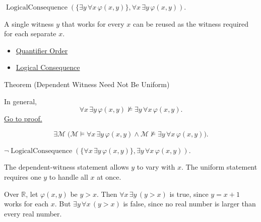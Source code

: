\begin{remark*}
\(\operatorname{LogicalConsequence}(\{\exists y\,\forall x\,\varphi(x,y)\},
\forall x\,\exists y\,\varphi(x,y))\).
\end{remark*}

\begin{remark*}[Interpretation]
A single witness \(y\) that works for every \(x\) can be reused as the
witness required for each separate \(x\).
\end{remark*}

\begin{dependencies}
\begin{itemize}
  \item \hyperref[def:q-alt]{Quantifier Order}
  \item \hyperref[def:log-consequence]{Logical Consequence}
\end{itemize}
\end{dependencies}

\begin{theorembox}{Theorem (Dependent Witness Need Not Be Uniform)}
\begin{theorem}
\label{thm:dependent-witness-not-uniform}
In general,
\[
\forall x\,\exists y\,\varphi(x,y)
\not\models
\exists y\,\forall x\,\varphi(x,y).
\]
\hyperref[prf:dependent-witness-not-uniform]{Go to proof.}
\end{theorem}
\end{theorembox}

\begin{remark*}
\[
\exists \mathcal M\;
\bigl(
\mathcal M\models\forall x\,\exists y\,\varphi(x,y)
\land
\mathcal M\not\models\exists y\,\forall x\,\varphi(x,y)
\bigr).
\]
\end{remark*}

\begin{remark*}
\(\neg\operatorname{LogicalConsequence}(\{\forall x\,\exists y\,\varphi(x,y)\},
\exists y\,\forall x\,\varphi(x,y))\).
\end{remark*}

\begin{remark*}[Interpretation]
The dependent-witness statement allows \(y\) to vary with \(x\). The uniform
statement requires one \(y\) to handle all \(x\) at once.
\end{remark*}

\begin{remark*}[Exposition]
Over \(\mathbb R\), let \(\varphi(x,y)\) be \(y>x\). Then
\(\forall x\,\exists y\,(y>x)\) is true, since \(y=x+1\) works for each \(x\).
But \(\exists y\,\forall x\,(y>x)\) is false, since no real number is larger
than every real number.
\end{remark*}

